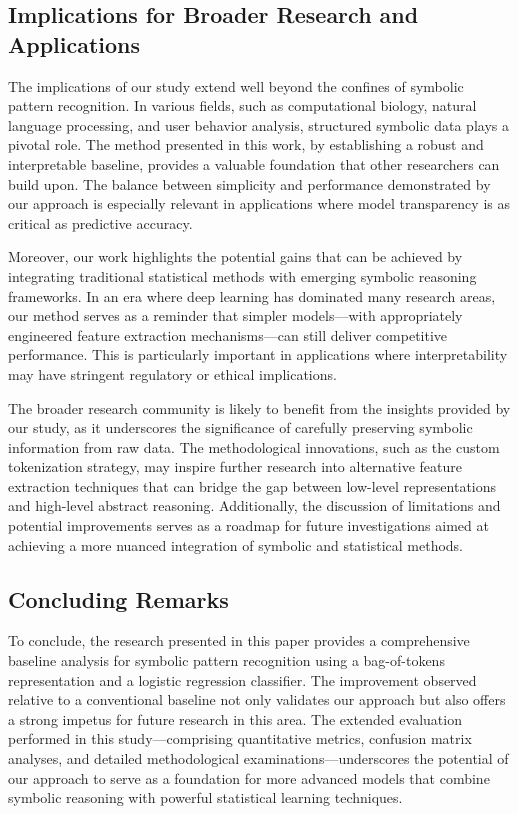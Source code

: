 \documentclass{article}
\begin{document}
\subsection*{Implications for Broader Research and Applications}
The implications of our study extend well beyond the confines of symbolic pattern recognition. In various fields, such as computational biology, natural language processing, and user behavior analysis, structured symbolic data plays a pivotal role. The method presented in this work, by establishing a robust and interpretable baseline, provides a valuable foundation that other researchers can build upon. The balance between simplicity and performance demonstrated by our approach is especially relevant in applications where model transparency is as critical as predictive accuracy.

Moreover, our work highlights the potential gains that can be achieved by integrating traditional statistical methods with emerging symbolic reasoning frameworks. In an era where deep learning has dominated many research areas, our method serves as a reminder that simpler models—with appropriately engineered feature extraction mechanisms—can still deliver competitive performance. This is particularly important in applications where interpretability may have stringent regulatory or ethical implications.

The broader research community is likely to benefit from the insights provided by our study, as it underscores the significance of carefully preserving symbolic information from raw data. The methodological innovations, such as the custom tokenization strategy, may inspire further research into alternative feature extraction techniques that can bridge the gap between low-level representations and high-level abstract reasoning. Additionally, the discussion of limitations and potential improvements serves as a roadmap for future investigations aimed at achieving a more nuanced integration of symbolic and statistical methods.

\subsection*{Concluding Remarks}
To conclude, the research presented in this paper provides a comprehensive baseline analysis for symbolic pattern recognition using a bag-of-tokens representation and a logistic regression classifier. The improvement observed relative to a conventional baseline not only validates our approach but also offers a strong impetus for future research in this area. The extended evaluation performed in this study—comprising quantitative metrics, confusion matrix analyses, and detailed methodological examinations—underscores the potential of our approach to serve as a foundation for more advanced models that combine symbolic reasoning with powerful statistical learning techniques.
\end{document}
